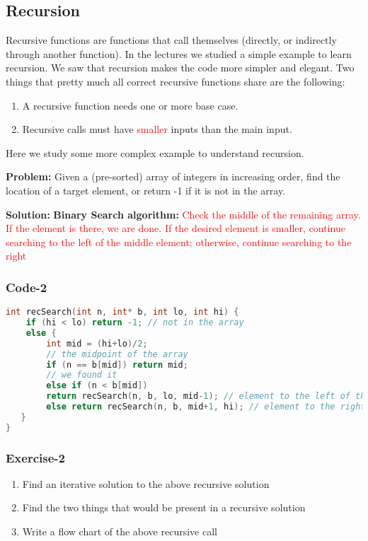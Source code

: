 \documentclass{article}
\newcommand{\red}[1]{\textcolor{red}{#1}}
\begin{document}
\subsection*{Recursion}
Recursive functions are functions that call themselves (directly, or indirectly through another function). In the lectures we studied a simple example to learn recursion. We saw that recursion makes the code more simpler and elegant. Two things that pretty much all correct recursive functions share are the following:

\begin{enumerate}
\item A recursive function needs one or more base case.
\item Recursive calls must have \red{smaller} inputs than the main input.
\end{enumerate}
Here we study some more complex example to understand recursion.

\medskip

\textbf{Problem:} Given a (pre-sorted) array of integers in increasing order, find the location of a target element, or return -1
if it is not in the array. 

\medskip

\textbf{Solution:} \textbf{Binary Search algorithm:} \red{Check the middle of the remaining array. If the
element is there, we are done. If the desired element is smaller, continue searching to the left of the middle
element; otherwise, continue searching to the right}

\subsubsection*{Code-2}
\begin{lstlisting}[language=C++]
int recSearch(int n, int* b, int lo, int hi) {
    if (hi < lo) return -1; // not in the array
    else {
        int mid = (hi+lo)/2;
        // the midpoint of the array
        if (n == b[mid]) return mid;
        // we found it
        else if (n < b[mid])
        return recSearch(n, b, lo, mid-1); // element to the left of the midpoint
        else return recSearch(n, b, mid+1, hi); // element to the right of the midpoint
   }
}

\end{lstlisting}

\subsubsection{Exercise-2}
\begin{enumerate}
\item Find an iterative solution to the above recursive solution
\item Find the two things that would be present in a recursive solution
\item Write a flow chart of the above recursive call
\end{enumerate}
\end{document}
